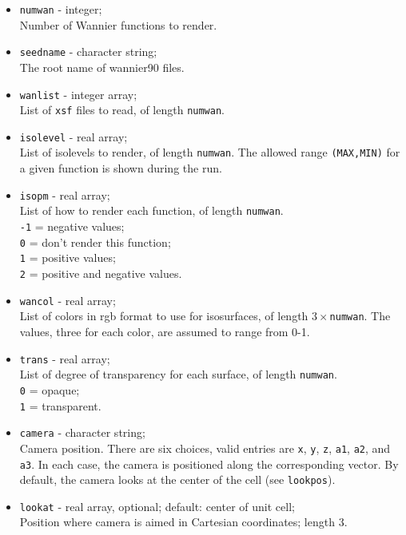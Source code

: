\documentclass[
  notitlepage,
  twoside,
   prb,
  floatfix,
]{revtex4-1}
\begin{document}
\begin{itemize}
\item
{\tt numwan} - integer; \\
Number of Wannier functions to render.

\item
{\tt seedname} - character string; \\
The root name of \textsf{wannier90} files.

\item
{\tt wanlist}  - integer array; \\
List of {\tt xsf} files to read, of length {\tt numwan}.

\item
{\tt isolevel} - real array; \\
List of isolevels to render, of length {\tt numwan}. The allowed range {\tt (MAX,MIN)}
for a given function is shown during the run.

\item
{\tt isopm} - real array; \\
List of how to render each function, of length {\tt numwan}. \\
{\tt -1} = negative values; \\
{\tt  0} = don't render this function; \\
{\tt 1} = positive values; \\
{\tt 2} = positive and negative values.

\item
{\tt wancol} - real array; \\
 List of colors in rgb format to use for isosurfaces, of length $3\times${\tt numwan}. The values, three for each color, are assumed to range from 0-1.

\item
{\tt trans} - real array;\\
 List of degree of transparency for each surface, of length {\tt numwan}. \\
{\tt 0} = opaque; \\
{\tt 1} = transparent.

\item
{\tt camera} - character string; \\
Camera position. There are six choices, valid entries are {\tt x}, {\tt y}, {\tt z},
{\tt a1}, {\tt a2}, and {\tt a3}. In each case, the camera is positioned along the corresponding vector. By default, the camera looks at the center of the cell (see {\tt lookpos}).

\item
{\tt lookat} - real array, optional; default: center of unit cell; \\
Position where camera is aimed in Cartesian coordinates; length 3.


\end{itemize}
\end{document}
